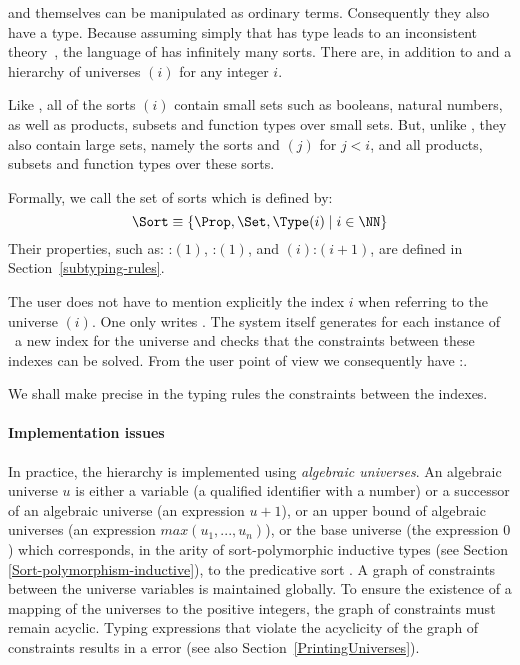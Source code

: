 {\Prop} and {\Set} themselves can be manipulated as ordinary
terms. Consequently they also have a type. Because assuming simply
that {\Set} has type {\Set} leads to an inconsistent theory~\cite{Coq86}, the
language of {\CIC} has infinitely many sorts. There are, in addition
to {\Set} and {\Prop} a hierarchy of universes {\Type$(i)$} for any
integer $i$.

Like {\Set}, all of the sorts {\Type$(i)$} contain small sets such as
booleans, natural numbers, as well as products, subsets and function
types over small sets. But, unlike {\Set}, they also contain large
sets, namely the sorts {\Set} and {\Type$(j)$} for $j<i$, and all
products, subsets and function types over these sorts.

Formally, we call {\Sort} the set of sorts which is defined by:
%
%
%
\[\Sort \equiv \{\Prop,\Set,\Type(i)\;|\; i \in \NN\} \]
Their properties, such as:
{\Prop:\Type$(1)$}, {\Set:\Type$(1)$}, and {\Type$(i)$:\Type$(i+1)$},
are defined in Section~\ref{subtyping-rules}.


The user does not have to mention explicitly the index $i$ when referring to
the universe \Type$(i)$. One only writes \Type. The
system itself generates for each instance of \Type\ a new
index for the universe and checks that the constraints between these
indexes can be solved. From the user point of view we consequently
have {\Type}:{\Type}.

We shall make precise in the typing rules the constraints between the
indexes. 

\paragraph{Implementation issues}
In practice, the {\Type} hierarchy is implemented using
{\em algebraic universes}.
An algebraic universe $u$ is either a variable (a qualified
identifier with a number) or a successor of an algebraic universe (an
expression $u+1$), or an upper bound of algebraic universes (an
expression $max(u_1,...,u_n)$), or the base universe (the expression
$0$) which corresponds, in the arity of sort-polymorphic inductive
types (see Section \ref{Sort-polymorphism-inductive}),
to the predicative sort {\Set}. A graph of constraints between
the universe variables is maintained globally. To ensure the existence
of a mapping of the universes to the positive integers, the graph of
constraints must remain acyclic.  Typing expressions that violate the
acyclicity of the graph of constraints results in a  error (see also Section~\ref{PrintingUniverses}).


